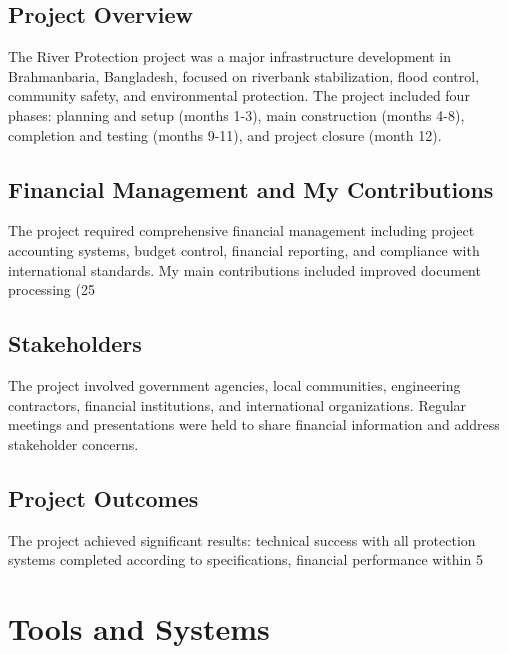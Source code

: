 \subsection{Project Overview}
The River Protection project was a major infrastructure development in Brahmanbaria, Bangladesh, focused on riverbank stabilization, flood control, community safety, and environmental protection. The project included four phases: planning and setup (months 1-3), main construction (months 4-8), completion and testing (months 9-11), and project closure (month 12).

\subsection{Financial Management and My Contributions}
The project required comprehensive financial management including project accounting systems, budget control, financial reporting, and compliance with international standards. My main contributions included improved document processing (25%

\subsection{Stakeholders}
The project involved government agencies, local communities, engineering contractors, financial institutions, and international organizations. Regular meetings and presentations were held to share financial information and address stakeholder concerns.

\vspace{0.3em}
\subsection{Project Outcomes}
The project achieved significant results: technical success with all protection systems completed according to specifications, financial performance within 5%

\vspace{0.5em}
\section{Tools and Systems}

